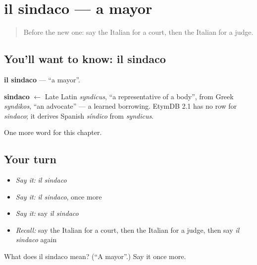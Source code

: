 \section[il sindaco]{il sindaco — a mayor}

\label{lesson:IT-C161-sindaco}



\begin{quote}
Before the new one: say the Italian for a court, then the Italian for a judge.
\end{quote}

\subsection*{You'll want to know: il sindaco}
\textbf{il sindaco} — \textquotedblleft{}a mayor\textquotedblright{}.

\begin{cousinweb}
\textbf{sindaco} $\leftarrow$ Late Latin \emph{syndicus}, \textquotedblleft{}a representative of a body\textquotedblright{}, from Greek \emph{syndikos}, \textquotedblleft{}an advocate\textquotedblright{} — a learned borrowing. EtymDB 2.1 has no row for \emph{sindaco}; it derives Spanish \emph{síndico} from \emph{syndicus}.
\end{cousinweb}

\begin{grammarlens}[title={What you've built}]
One more word for this chapter.
\end{grammarlens}

\subsection*{Your turn}
\begin{itemize}
\raggedright
  \item \emph{Say it:} \emph{il sindaco}
  \item \emph{Say it:} \emph{il sindaco}, once more
  \item \emph{Say it:} say \emph{il sindaco}
  \item \emph{Recall:} say the Italian for a court, then the Italian for a judge, then say \emph{il sindaco} again
\end{itemize}

\begin{tcolorbox}[breakable,colback=teal!4,colframe=teal!35!black,title={Before you move on}]
What does il sindaco mean? (\textquotedblleft{}A mayor\textquotedblright{}.) Say it once more.
\end{tcolorbox}
